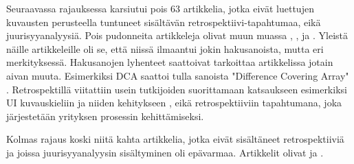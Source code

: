 Seuraavassa rajauksessa karsiutui pois 63 artikkelia, jotka eivät luettujen kuvausten perusteella tuntuneet sisältävän retrospektiivi-tapahtumaa, eikä juurisyyanalyysiä. Pois pudonneita artikkeleja olivat muun muassa \citep{yang2012personalized}, \citep{ji2010constructions}, \citep{helms2008retrospective} ja \citep{richardson2006developing}. Yleistä näille artikkeleille oli se, että niissä ilmaantui jokin hakusanoista, mutta eri merkityksessä. Hakusanojen lyhenteet saattoivat tarkoittaa artikkelissa jotain aivan muuta. Esimerkiksi DCA saattoi tulla sanoista "Difference Covering Array" \citep{ji2010constructions}. Retrospektillä viitattiin usein tutkijoiden suorittamaan katsaukseen esimerkiksi UI kuvauskieliin ja niiden kehitykseen \citep{helms2008retrospective}, eikä retrospektiiviin tapahtumana, joka järjestetään yrityksen prosessin kehittämiseksi.

Kolmas rajaus koski niitä kahta artikkelia, jotka eivät sisältäneet retrospektiiviä ja joissa juurisyyanalyysin sisältyminen oli epävarmaa. Artikkelit olivat \citep{anquetil2007software} ja \citep{wang2004strider}.

